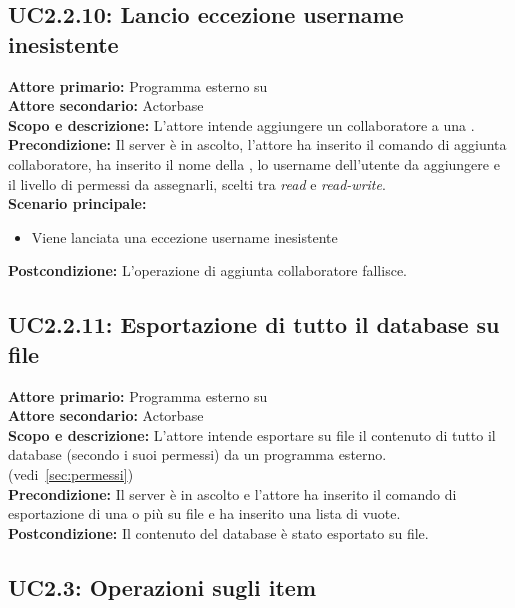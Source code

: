 \documentclass{scalatekids-article}
\begin{document}
\subsection{UC2.2.10: Lancio eccezione username inesistente}

\textbf{Attore primario:} Programma esterno su \\
\textbf{Attore secondario:} Actorbase\\
\textbf{Scopo e descrizione:} L'attore intende aggiungere un collaboratore a una .\\
\textbf{Precondizione:} Il server è in ascolto, l'attore ha inserito il comando di aggiunta collaboratore, ha inserito il nome della , lo username dell'utente da aggiungere e il livello di permessi da assegnarli, scelti tra \textit{read} e \textit{read-write}.\\
\textbf{Scenario principale:}
\begin{itemize}
\item Viene lanciata una eccezione username inesistente
\end{itemize}
\textbf{Postcondizione:} L'operazione di aggiunta collaboratore fallisce.

\subsection{UC2.2.11: Esportazione di tutto il database su file}

\textbf{Attore primario:} Programma esterno su \\
\textbf{Attore secondario:} Actorbase\\
\textbf{Scopo e descrizione:} L'attore intende esportare su file il contenuto di tutto il database (secondo i suoi permessi) da un programma  esterno. (vedi~\ref{sec:permessi})\\
\textbf{Precondizione:} Il server è in ascolto e l'attore ha inserito il comando di esportazione di una o più  su file e ha inserito una lista di  vuote.\\
\textbf{Postcondizione:} Il contenuto del database è stato esportato su file.

\subsection{UC2.3: Operazioni sugli item}
\end{document}

